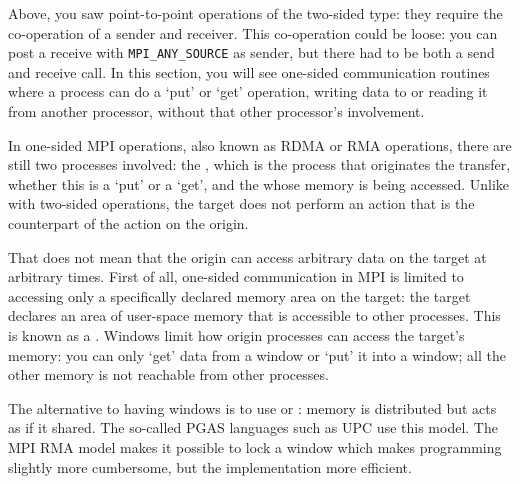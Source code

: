 

Above, you saw  point-to-point operations of the two-sided type:
they require the co-operation of a sender and
receiver. This co-operation could be loose: you can post a receive
with \lstinline$MPI_ANY_SOURCE$ as sender, but there had to be both a send and
receive call. In this section, you will see one-sided communication 
routines where a process
can do a `put' or `get' operation, writing data to or reading it from
another processor, without that other processor's involvement.

In one-sided MPI operations, also known as \acf{RDMA} or 
\acf{RMA} operations, there
are still two processes involved: the , which is the
process that originates the transfer, whether this is a `put' or a `get',
and the  whose
memory is being accessed. Unlike with two-sided operations, the target
does not perform an action that is the counterpart of the action on the origin.

That does not mean that the origin can access arbitrary data on the target
at arbitrary times. First of all, one-sided communication in MPI
is limited to accessing only a specifically declared memory area on the target:
the target declares an area of
user-space memory that is accessible to other processes. This is known
as a . Windows limit how origin processes can access
the target's memory: you can only `get' data from a window or `put' it
into a window; all the other memory is not reachable from other processes.

The alternative to having windows is to use 
or : memory is distributed but acts as if
it shared. The so-called \acf{PGAS} languages such as \ac{UPC} use this model.
The MPI \ac{RMA} model makes it possible to 
lock a window which makes programming slightly more cumbersome, but the
implementation more efficient.

